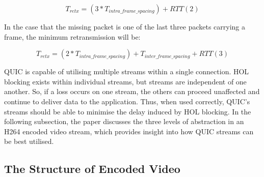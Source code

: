 \documentclass{mpaper}
\begin{document}
\[ T_{retx} = (3*T_{intra\_frame\_spacing}) + RTT  (2)\]

In the case that the missing packet is one of the last three packets carrying a frame, the minimum retransmission will be:

\[ T_{retx} = (2*T_{intra\_frame\_spacing}) + T_{inter\_frame\_spacing} + RTT (3)\]

QUIC is capable of utilising multiple streams within a single connection. HOL blocking exists within individual streams, but streams are independent of one another. So, if a loss occurs on one stream, the others can proceed unaffected and continue to deliver data to the application. Thus, when used correctly, QUIC's streams should be able to minimise the delay induced by HOL blocking. In the following subsection, the paper discusses the three levels of abstraction in an H264 encoded video stream, which provides insight into how QUIC streams can be best utilised.


\subsection{The Structure of Encoded Video} \label{The Structure of Encoded Video}
\end{document}
